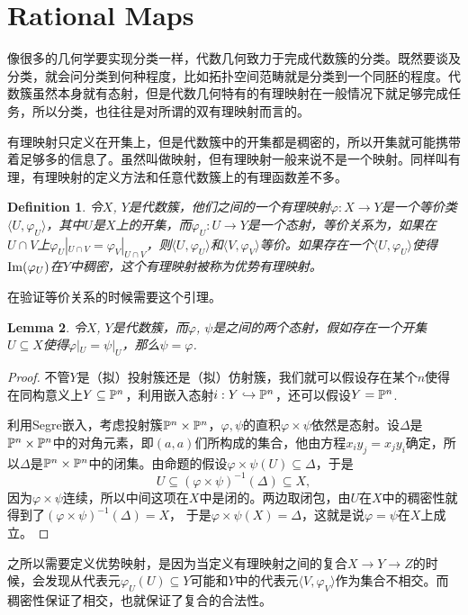 \documentclass[9pt]{extbook}
\theoremstyle{plain}%
\newtheorem{defi}{Definition}[section]%
\newtheorem{lem}[defi]{Lemma}%
\begin{document}
\section{Rational Maps}
像很多的几何学要实现分类一样，代数几何致力于完成代数簇的分类。既然要谈及分类，就会问分类到何种程度，比如拓扑空间范畴就是分类到一个同胚的程度。代数簇虽然本身就有态射，但是代数几何特有的有理映射在一般情况下就足够完成任务，所以分类，也往往是对所谓的双有理映射而言的。

有理映射只定义在开集上，但是代数簇中的开集都是稠密的，所以开集就可能携带着足够多的信息了。虽然叫做映射，但有理映射一般来说不是一个映射。同样叫有理，有理映射的定义方法和任意代数簇上的有理函数差不多。
\begin{defi}
令$X$, $Y$是代数簇，他们之间的一个有理映射$\varphi : X\to Y$是一个等价类$\langle U,\varphi_U\rangle$，其中$U$是$X$上的开集，而$\varphi_U:U\to Y$是一个态射，等价关系为，如果在$U\cap V$上$\varphi_U|_{U\cap V}=\varphi_V|_{U\cap V}$，则$\langle U,\varphi_U\rangle$和$\langle V,\varphi_V\rangle$等价。如果存在一个$\langle U,\varphi_U\rangle$使得$\operatorname{Im}(\varphi_U)$在$Y$中稠密，这个有理映射被称为优势有理映射。
\end{defi}
在验证等价关系的时候需要这个引理。
\begin{lem}
	令$X$, $Y$是代数簇，而$\varphi$, $\psi$是之间的两个态射，假如存在一个开集$U\subseteq X$使得$\varphi|_U=\psi|_U$，那么$\psi=\varphi$.
\end{lem}
\begin{proof}
	不管$Y$是（拟）投射簇还是（拟）仿射簇，我们就可以假设存在某个$n$使得在同构意义上$Y\subseteq \mathbb{P}^n$，利用嵌入态射$i:Y\hookrightarrow \mathbb{P}^n$，还可以假设$Y=\mathbb{P}^n$.

	利用Segre嵌入，考虑投射簇$\mathbb{P}^n\times \mathbb{P}^n$，$\varphi,\psi$的直积$\varphi\times \psi$依然是态射。设$\Delta$是$\mathbb{P}^n\times \mathbb{P}^n$中的对角元素，即$(a,a)$们所构成的集合，他由方程$x_iy_j=x_jy_i$确定，所以$\Delta$是$\mathbb{P}^n\times \mathbb{P}^n$中的闭集。由命题的假设$\varphi\times \psi(U)\subseteq \Delta$，于是
	\[
		U\subseteq (\varphi\times \psi)^{-1}(\Delta)\subseteq X,
	\]
	因为$\varphi\times \psi$连续，所以中间这项在$X$中是闭的。两边取闭包，由$U$在$X$中的稠密性就得到了$(\varphi\times \psi)^{-1}(\Delta)=X$，
	于是$\varphi\times \psi(X)=\Delta$，这就是说$\varphi=\psi$在$X$上成立。
\end{proof}
之所以需要定义优势映射，是因为当定义有理映射之间的复合$X\to Y \to Z$的时候，会发现从代表元$\varphi_U(U)\subseteq Y$可能和$Y$中的代表元$\langle V,\varphi_V\rangle$作为集合不相交。而稠密性保证了相交，也就保证了复合的合法性。
\end{document}
